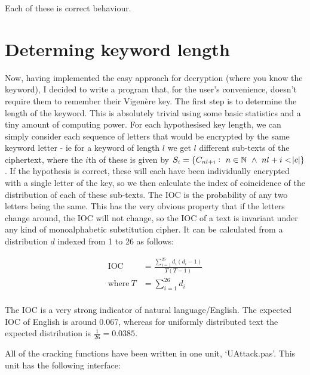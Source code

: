 \documentclass{article}
\begin{document}
    Each of these is correct behaviour.

    \section{Determing keyword length}

    Now, having implemented the easy approach for decryption (where you know
    the keyword), I decided to write a program that, for the user's
    convenience, doesn't require them to remember their Vigen\`ere key. The
    first step is to determine the length of the keyword. This is absolutely
    trivial using some basic statistics and a tiny amount of computing power.
    For each hypothesised key length, we can simply consider each sequence of
    letters that would be encrypted by the same keyword letter - ie for a
    keyword of length $l$ we get $l$ different sub-texts of the ciphertext,
    where the $i$th of these is given by $S_i = \{C_{nl + i}:\ n \in \mathbb{N}
    \ \land\ nl + i < \abs{c}\}$. If the hypothesis is correct, these will each
    have been individually encrypted with a single letter of the key, so  we
    then calculate the index of coincidence of the distribution of each of
    these sub-texts. The IOC is the probability of any two letters being the
    same. This has the very obvious property that if the letters change around,
    the IOC will not change, so the IOC of a text is invariant under any kind
    of monoalphabetic substitution cipher. It can be calculated from a
    distribution $d$ indexed from 1 to 26 as follows:

\begin{align*}
    \text{IOC}\ &= \frac{\sum\limits_{i = 1}^{26} d_i (d_i - 1)}{T (T - 1)}\\
    \text{where}\ T &= \sum\limits_{i = 1}^{26} d_i\\
\end{align*}

    The IOC is a very strong indicator of natural language/English. The
    expected IOC of English is around 0.067, whereas for uniformly distributed
    text the expected distribution is $\frac{1}{26} = 0.0385$.

    All of the cracking functions have been written in one unit, `UAttack.pas'.
    This unit has the following interface:
\end{document}
